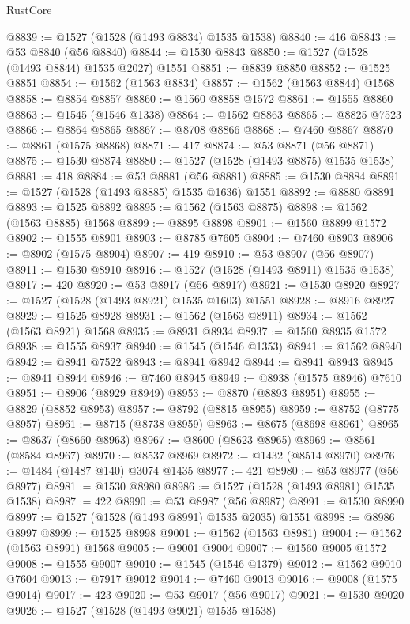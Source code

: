 \begin{lexlean}{RustCore}
\begin{coremodule}
@8839 := @1527 (@1528 (@1493 @8834) @1535 @1538)
@8840 := 416
@8843 := @53 @8840 (@56 @8840)
@8844 := @1530 @8843
@8850 := @1527 (@1528 (@1493 @8844) @1535 @2027) @1551
@8851 := @8839 @8850
@8852 := @1525 @8851
@8854 := @1562 (@1563 @8834)
@8857 := @1562 (@1563 @8844) @1568
@8858 := @8854 @8857
@8860 := @1560 @8858 @1572
@8861 := @1555 @8860
@8863 := @1545 (@1546 @1338)
@8864 := @1562 @8863
@8865 := @8825 @7523
@8866 := @8864 @8865
@8867 := @8708 @8866
@8868 := @7460 @8867
@8870 := @8861 (@1575 @8868)
@8871 := 417
@8874 := @53 @8871 (@56 @8871)
@8875 := @1530 @8874
@8880 := @1527 (@1528 (@1493 @8875) @1535 @1538)
@8881 := 418
@8884 := @53 @8881 (@56 @8881)
@8885 := @1530 @8884
@8891 := @1527 (@1528 (@1493 @8885) @1535 @1636) @1551
@8892 := @8880 @8891
@8893 := @1525 @8892
@8895 := @1562 (@1563 @8875)
@8898 := @1562 (@1563 @8885) @1568
@8899 := @8895 @8898
@8901 := @1560 @8899 @1572
@8902 := @1555 @8901
@8903 := @8785 @7605
@8904 := @7460 @8903
@8906 := @8902 (@1575 @8904)
@8907 := 419
@8910 := @53 @8907 (@56 @8907)
@8911 := @1530 @8910
@8916 := @1527 (@1528 (@1493 @8911) @1535 @1538)
@8917 := 420
@8920 := @53 @8917 (@56 @8917)
@8921 := @1530 @8920
@8927 := @1527 (@1528 (@1493 @8921) @1535 @1603) @1551
@8928 := @8916 @8927
@8929 := @1525 @8928
@8931 := @1562 (@1563 @8911)
@8934 := @1562 (@1563 @8921) @1568
@8935 := @8931 @8934
@8937 := @1560 @8935 @1572
@8938 := @1555 @8937
@8940 := @1545 (@1546 @1353)
@8941 := @1562 @8940
@8942 := @8941 @7522
@8943 := @8941 @8942
@8944 := @8941 @8943
@8945 := @8941 @8944
@8946 := @7460 @8945
@8949 := @8938 (@1575 @8946) @7610
@8951 := @8906 (@8929 @8949)
@8953 := @8870 (@8893 @8951)
@8955 := @8829 (@8852 @8953)
@8957 := @8792 (@8815 @8955)
@8959 := @8752 (@8775 @8957)
@8961 := @8715 (@8738 @8959)
@8963 := @8675 (@8698 @8961)
@8965 := @8637 (@8660 @8963)
@8967 := @8600 (@8623 @8965)
@8969 := @8561 (@8584 @8967)
@8970 := @8537 @8969
@8972 := @1432 (@8514 @8970)
@8976 := @1484 (@1487 @140) @3074 @1435
@8977 := 421
@8980 := @53 @8977 (@56 @8977)
@8981 := @1530 @8980
@8986 := @1527 (@1528 (@1493 @8981) @1535 @1538)
@8987 := 422
@8990 := @53 @8987 (@56 @8987)
@8991 := @1530 @8990
@8997 := @1527 (@1528 (@1493 @8991) @1535 @2035) @1551
@8998 := @8986 @8997
@8999 := @1525 @8998
@9001 := @1562 (@1563 @8981)
@9004 := @1562 (@1563 @8991) @1568
@9005 := @9001 @9004
@9007 := @1560 @9005 @1572
@9008 := @1555 @9007
@9010 := @1545 (@1546 @1379)
@9012 := @1562 @9010 @7604
@9013 := @7917 @9012
@9014 := @7460 @9013
@9016 := @9008 (@1575 @9014)
@9017 := 423
@9020 := @53 @9017 (@56 @9017)
@9021 := @1530 @9020
@9026 := @1527 (@1528 (@1493 @9021) @1535 @1538)

\end{coremodule}
\end{lexlean}
